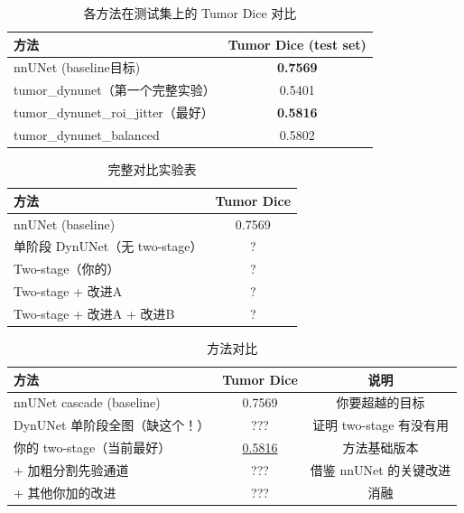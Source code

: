 \documentclass{article}
\begin{document}
	
	
	\begin{table}[H]
		\centering
		\caption{各方法在测试集上的 Tumor Dice 对比}
		\begin{tabular}{lc}
			\hline
			\textbf{方法} & \textbf{Tumor Dice (test set)} \\
			\hline
			nnUNet (baseline目标)            & \textbf{0.7569} \\
			tumor\_dynunet（第一个完整实验）  & 0.5401 \\
			tumor\_dynunet\_roi\_jitter（最好）& \textbf{0.5816} \\
			tumor\_dynunet\_balanced         & 0.5802 \\
			\hline
		\end{tabular}
	\end{table}
	
	\begin{table}[H]
		\centering
		\caption{完整对比实验表}
		\begin{tabular}{lc}
			\hline
			\textbf{方法} & \textbf{Tumor Dice} \\
			\hline
			nnUNet (baseline)              & 0.7569 \\
			单阶段 DynUNet（无 two-stage） & ?      \\
			Two-stage（你的）              & ?      \\
			Two-stage + 改进A              & ?      \\
			Two-stage + 改进A + 改进B      & ?      \\
			\hline
		\end{tabular}
	\end{table}
	
	
	\begin{table}[H]
		\centering
		\caption{方法对比}
		\begin{tabular}{lcc}
			\hline
			\textbf{方法} & \textbf{Tumor Dice} & \textbf{说明} \\
			\hline
			nnUNet cascade (baseline)  & 0.7569              & 你要超越的目标 \\
			DynUNet 单阶段全图（缺这个！）& ???              & 证明 two-stage 有没有用 \\
			你的 two-stage（当前最好）  & \underline{0.5816}  & 方法基础版本 \\
			+ 加粗分割先验通道          & ???                 & 借鉴 nnUNet 的关键改进 \\
			+ 其他你加的改进            & ???                 & 消融 \\
			\hline
		\end{tabular}
	\end{table}
	
\end{document}
